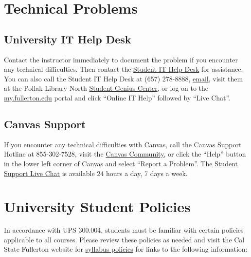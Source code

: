 \documentclass[11pt, letterpaper]{article}
\begin{document}
\section{Technical Problems}

\subsection*{University IT Help Desk}

Contact the instructor immediately to document the problem if you encounter any technical difficulties. Then contact the \href{http://www.fullerton.edu/it/students/helpdesk/index.php}{Student IT Help Desk} for assistance. You can also call the Student IT Help Desk at (657) 278-8888, \href{mailto:StudentITHelpDesk@fullerton.edu}{email}, visit them at the Pollak Library North \href{http://www.fullerton.edu/it/students/sgc/index.php}{Student Genius Center}, or log on to the \href{http://my.fullerton.edu/}{my.fullerton.edu} portal and click ``Online IT Help'' followed by ``Live Chat''.

\subsection*{Canvas Support}

If you encounter any technical difficulties with Canvas, call the Canvas Support Hotline at 855-302-7528, visit the \href{https://community.canvaslms.com/docs/DOC-10720-67952720329}{Canvas Community}, or click the ``Help'' button in the lower left corner of Canvas and select ``Report a Problem''. The \href{https://cases.canvaslms.com/liveagentchat?chattype=student&sfid=001A000000YzcwQIAR}{Student Support Live Chat} is available 24 hours a day, 7 days a week.



\section*{University Student Policies}

In accordance with UPS 300.004, students must be familiar with certain policies applicable to all courses. Please review these policies as needed and visit the Cal State Fullerton website for \href{https://fdc.fullerton.edu/teaching/student-info-syllabi.html}{syllabus policies} for links to the following information:
\end{document}
